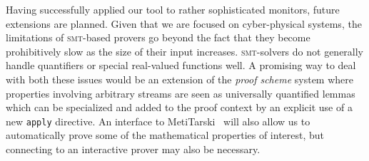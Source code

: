 Having successfully applied our tool to rather
sophisticated monitors,  future extensions are planned.  Given that we are
focused on  cyber-physical systems,  the limitations
of  \textsc{smt}-based provers go  beyond the fact that they become prohibitively slow as the
size of their input increases.  
\textsc{smt}-solvers do not generally handle quantifiers  or special real-valued
functions well. A promising way to deal with both these issues
would be an extension of the \textit{proof scheme} system where
properties involving arbitrary streams are seen as universally
quantified lemmas which can be specialized and added to the proof
context by an explicit use of a new \texttt{apply} directive.  An interface to 
MetiTarski~\cite{AkbarpourPaulson} will also allow us to automatically
prove some of
the mathematical properties of interest, but connecting to an
interactive prover may also be necessary. 


